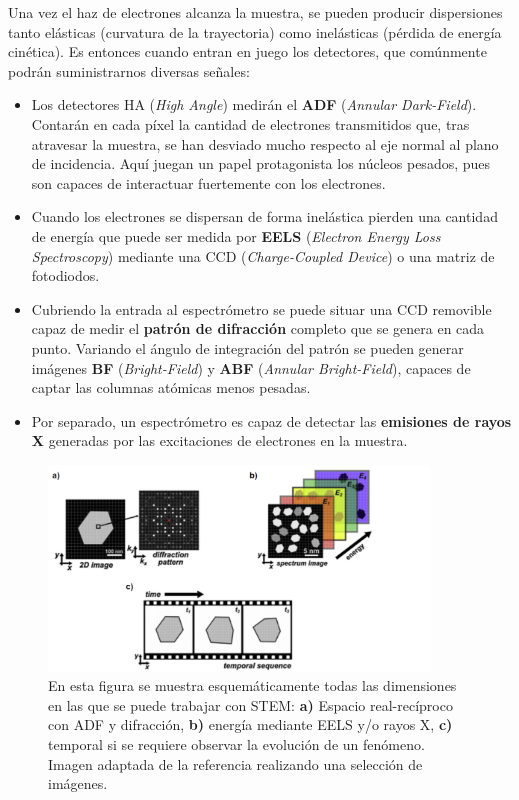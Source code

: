 Una vez el haz de electrones alcanza la muestra, se pueden producir dispersiones tanto elásticas (curvatura de la trayectoria) como inelásticas (pérdida de energía cinética). Es entonces cuando entran en juego los detectores, que comúnmente podrán suministrarnos diversas señales:

\begin{itemize}
    \item Los detectores HA (\textit{High Angle})  medirán el \textbf{ADF} (\textit{Annular Dark-Field}). Contarán en cada píxel la cantidad de electrones transmitidos que, tras atravesar la muestra, se han desviado mucho respecto al eje normal al plano de incidencia. Aquí juegan un papel protagonista los núcleos pesados, pues son capaces de interactuar fuertemente con los electrones.
    
    \item Cuando los electrones se dispersan de forma inelástica pierden una cantidad de energía que puede ser medida por \textbf{EELS} (\textit{Electron Energy Loss Spectroscopy}) mediante una CCD (\textit{Charge-Coupled Device}) o una matriz de fotodiodos.
    
    \item Cubriendo la entrada al espectrómetro se puede situar una CCD removible capaz de medir el \textbf{patrón de difracción} completo que se genera en cada punto. Variando el ángulo de integración del patrón se pueden generar imágenes \textbf{BF} (\textit{Bright-Field}) y \textbf{ABF} (\textit{Annular Bright-Field}), capaces de captar las columnas atómicas menos pesadas.
    
    \item Por separado, un espectrómetro es capaz de detectar las \textbf{emisiones de rayos X} generadas por las excitaciones de electrones en la muestra.
\end{itemize}

\vspace{0.1cm}

\begin{figure}[h!]
    \centering
    \includegraphics[width=0.9\textwidth]{fig/Fig2.png}
    \caption{En esta figura se muestra esquemáticamente todas las dimensiones en las que se puede trabajar con STEM: \textbf{a)} Espacio real-recíproco con ADF y difracción, \textbf{b)} energía mediante EELS y/o rayos X, \textbf{c)} temporal si se requiere observar la evolución de un fenómeno. Imagen adaptada de la referencia \cite{foto_intro} realizando una selección de imágenes.}
    \label{fig:2}
\end{figure}

